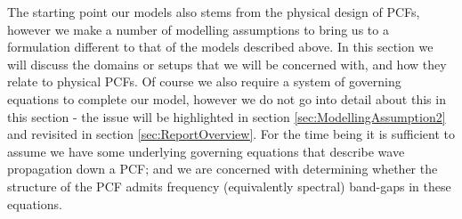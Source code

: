 The starting point our models also stems from the physical design of PCFs, however we make a number of modelling assumptions to bring us to a formulation different to that of the models described above.
In this section we will discuss the domains or setups that we will be concerned with, and how they relate to physical PCFs.
Of course we also require a system of governing equations to complete our model, however we do not go into detail about this in this section - the issue will be highlighted in section \ref{sec:ModellingAssumption2} and revisited in section \ref{sec:ReportOverview}.
For the time being it is sufficient to assume we have some underlying governing equations that describe wave propagation down a PCF; and we are concerned with determining whether the structure of the PCF admits frequency (equivalently spectral) band-gaps in these equations. \newline

